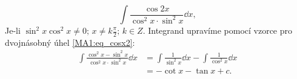 \begin{mdframed}[style=mdexam]
  \begin{example}\label{MAI:exam133}
    \begin{equation}\label{MA:int_ex_07} 
      \int\frac{\cos2x}{\cos^2x\cdot\sin^2x}\dd{x}, 
    \end{equation} 
    Je-li \(\sin^2x\cos^2x\neq0;\, x\neq k\frac{\pi}{2};\, k\in Z\).
    Integrand upravíme pomocí vzorce pro dvojnásobný úhel \ref{MA1:eq_cosx2}:
    \begin{align*}
      \int\frac{\cos^2x-\sin^2x}{\cos^2x\cdot\sin^2x}\dd{x} 
         &= \int\frac{1}{\sin^2x}\dd{x} -\int\frac{1}{\cos^2x}\dd{x}        \\
         &= -\cot x - \tan x + c. 
    \end{align*}
  \end{example}
\end{mdframed}